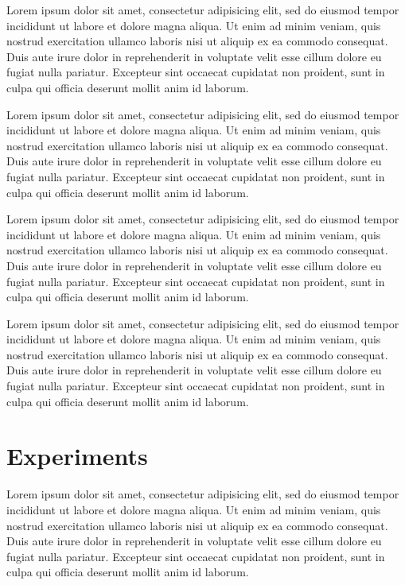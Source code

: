 \documentclass[11pt,letterpaper]{article}
\begin{document}
Lorem ipsum dolor sit amet, consectetur adipisicing elit, sed do eiusmod tempor incididunt ut labore et dolore magna aliqua. Ut enim ad minim veniam, quis nostrud exercitation ullamco laboris nisi ut aliquip ex ea commodo consequat. Duis aute irure dolor in reprehenderit in voluptate velit esse cillum dolore eu fugiat nulla pariatur. Excepteur sint occaecat cupidatat non proident, sunt in culpa qui officia deserunt mollit anim id laborum.

Lorem ipsum dolor sit amet, consectetur adipisicing elit, sed do eiusmod tempor incididunt ut labore et dolore magna aliqua. Ut enim ad minim veniam, quis nostrud exercitation ullamco laboris nisi ut aliquip ex ea commodo consequat. Duis aute irure dolor in reprehenderit in voluptate velit esse cillum dolore eu fugiat nulla pariatur. Excepteur sint occaecat cupidatat non proident, sunt in culpa qui officia deserunt mollit anim id laborum.

Lorem ipsum dolor sit amet, consectetur adipisicing elit, sed do eiusmod tempor incididunt ut labore et dolore magna aliqua. Ut enim ad minim veniam, quis nostrud exercitation ullamco laboris nisi ut aliquip ex ea commodo consequat. Duis aute irure dolor in reprehenderit in voluptate velit esse cillum dolore eu fugiat nulla pariatur. Excepteur sint occaecat cupidatat non proident, sunt in culpa qui officia deserunt mollit anim id laborum.

Lorem ipsum dolor sit amet, consectetur adipisicing elit, sed do eiusmod tempor incididunt ut labore et dolore magna aliqua. Ut enim ad minim veniam, quis nostrud exercitation ullamco laboris nisi ut aliquip ex ea commodo consequat. Duis aute irure dolor in reprehenderit in voluptate velit esse cillum dolore eu fugiat nulla pariatur. Excepteur sint occaecat cupidatat non proident, sunt in culpa qui officia deserunt mollit anim id laborum.

\section{Experiments}

Lorem ipsum dolor sit amet, consectetur adipisicing elit, sed do eiusmod tempor incididunt ut labore et dolore magna aliqua. Ut enim ad minim veniam, quis nostrud exercitation ullamco laboris nisi ut aliquip ex ea commodo consequat. Duis aute irure dolor in reprehenderit in voluptate velit esse cillum dolore eu fugiat nulla pariatur. Excepteur sint occaecat cupidatat non proident, sunt in culpa qui officia deserunt mollit anim id laborum.
\end{document}

